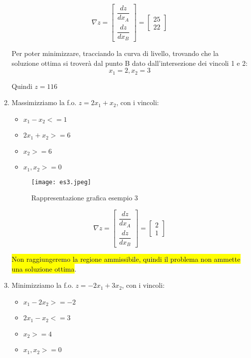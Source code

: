 \begin{enumerate}
		$$\nabla z = \left[\begin{array}{c}
			\dfrac{dz}{dx_A}\\
			\dfrac{dz}{dx_B}
		\end{array}\right] = \left[\begin{array}{c}
			25\\
			22
		\end{array}\right]
		$$
		
		Per poter minimizzare, tracciando la curva di livello, trovando che la soluzione ottima si troverà dal punto B dato dall'intersezione dei vincoli 1 e 2:
		$$x_1 = 2, x_2 = 3$$
		
		Quindi $z= 116$
		
	\item Massimizziamo la f.o. $z = 2x_1 + x_2$, con i vincoli:
		\begin{itemize}
			\item $x_1 - x_2 <= 1$
			\item $2x_1 + x_2 >= 6$
			\item $x_2 >= 6$
			\item $x_1, x_2 >= 0$
		\end{itemize}
		
		\begin{figure}[H]
		\centering
		\texttt{[image: es3.jpeg]}
		\caption{Rappresentazione grafica esempio 3} 
		\label{rge3}
		\end{figure}
		
		$$\nabla z = \left[\begin{array}{c}
			\dfrac{dz}{dx_A}\\
			\dfrac{dz}{dx_B}
		\end{array}\right] = \left[\begin{array}{c}
			2\\
			1
		\end{array}\right]
		$$
		
		\hl{Non raggiungeremo la regione ammissibile, quindi il problema non ammette una soluzione ottima}.
		
	\item Minimizziamo la f.o. $z = -2x_1 + 3x_2$, con i vincoli:
		\begin{itemize}
			\item $x_1 - 2x_2 >= -2$
			\item $2x_1 - x_2 <= 3$
			\item $x_2 >= 4$
			\item $x_1, x_2 >= 0$
		\end{itemize}
		

\end{enumerate}
